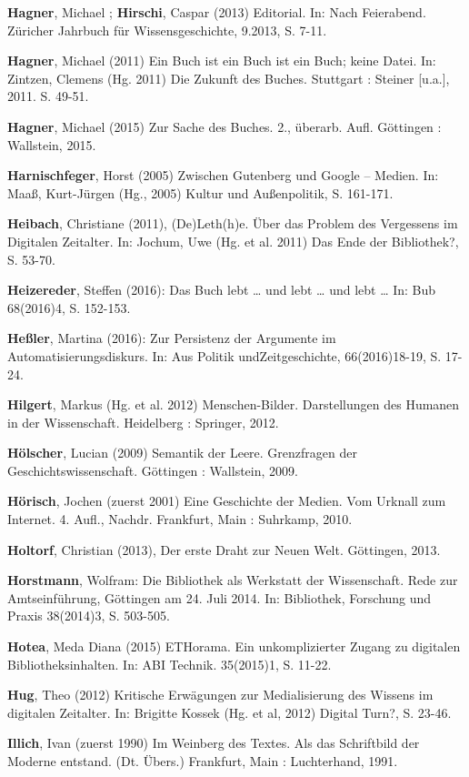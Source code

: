 \documentclass[a4paper,
fontsize=11pt,
oneside,
numbers=noperiodatend,
parskip=half-,
bibliography=totoc,
final
]{scrartcl}
\begin{document}
\textbf{Hagner}, Michael ; \textbf{Hirschi}, Caspar (2013) Editorial.
In: Nach Feierabend. Züricher Jahrbuch für Wissensgeschichte, 9.2013, S.
7-11.

\textbf{Hagner}, Michael (2011) Ein Buch ist ein Buch ist ein Buch;
keine Datei. In: Zintzen, Clemens (Hg. 2011) Die Zukunft des Buches.
Stuttgart : Steiner {[}u.a.{]}, 2011. S. 49-51.

\textbf{Hagner}, Michael (2015) Zur Sache des Buches. 2., überarb. Aufl.
Göttingen : Wallstein, 2015.

\textbf{Harnischfeger}, Horst (2005) Zwischen Gutenberg und Google --
Medien. In: Maaß, Kurt-Jürgen (Hg., 2005) Kultur und Außenpolitik, S.
161-171.

\textbf{Heibach}, Christiane (2011), (De)Leth(h)e. Über das Problem des
Vergessens im Digitalen Zeitalter. In: Jochum, Uwe (Hg. et al. 2011) Das
Ende der Bibliothek?, S. 53-70.

\textbf{Heizereder}, Steffen (2016): Das Buch lebt \ldots{} und lebt
\ldots{} und lebt \ldots{} In: Bub 68(2016)4, S. 152-153.

\textbf{Heßler}, Martina (2016): Zur Persistenz der Argumente im
Automatisierungsdiskurs. In: Aus Politik undZeitgeschichte,
66(2016)18-19, S. 17-24.

\textbf{Hilgert}, Markus (Hg. et al. 2012) Menschen-Bilder.
Darstellungen des Humanen in der Wissenschaft. Heidelberg : Springer,
2012.

\textbf{Hölscher}, Lucian (2009) Semantik der Leere. Grenzfragen der
Geschichtswissenschaft. Göttingen : Wallstein, 2009.

\textbf{Hörisch}, Jochen (zuerst 2001) Eine Geschichte der Medien. Vom
Urknall zum Internet. 4. Aufl., Nachdr. Frankfurt, Main : Suhrkamp,
2010.

\textbf{Holtorf}, Christian (2013), Der erste Draht zur Neuen Welt.
Göttingen, 2013.

\textbf{Horstmann}, Wolfram: Die Bibliothek als Werkstatt der
Wissenschaft. Rede zur Amtseinführung, Göttingen am 24. Juli 2014. In:
Bibliothek, Forschung und Praxis 38(2014)3, S. 503-505.

\textbf{Hotea}, Meda Diana (2015) ETHorama. Ein unkomplizierter Zugang
zu digitalen Bibliotheksinhalten. In: ABI Technik. 35(2015)1, S. 11-22.

\textbf{Hug}, Theo (2012) Kritische Erwägungen zur Medialisierung des
Wissens im digitalen Zeitalter. In: Brigitte Kossek (Hg. et al, 2012)
Digital Turn?, S. 23-46.

\textbf{Illich}, Ivan (zuerst 1990) Im Weinberg des Textes. Als das
Schriftbild der Moderne entstand. (Dt. Übers.) Frankfurt, Main :
Luchterhand, 1991.
\end{document}
